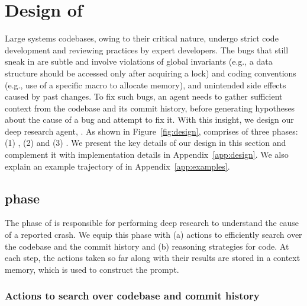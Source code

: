 \section{Design of \cresearcher{}}%
\label{sec:solution}

Large systems codebases, owing to their critical nature, undergo strict code development and reviewing practices by expert developers. The bugs that still sneak in are subtle and involve violations of global invariants (e.g., a data structure should be accessed only after acquiring a lock) and coding conventions (e.g., use of a specific macro to allocate memory), and unintended side effects caused by past changes. To fix such bugs, an agent needs to gather sufficient context from the codebase and its commit history, before generating hypotheses about the cause of a bug and attempt to fix it. With this insight, we design our deep research agent, \cresearcher{}. As shown in Figure~\ref{fig:design}, \cresearcher{} comprises of three phases: (1) \analysisphase, (2) \synthesisphase and (3) \validationphase.
We present the key details of our design in this section and complement it with implementation details in Appendix~\ref{app:design}.
We also explain an example trajectory of \cresearcher{} in Appendix~\ref{app:examples}.

\subsection{\analysisphase phase}

The \analysisphase phase of \cresearcher{} is responsible for performing deep research to understand the cause of a reported crash.
We equip this phase with (a) actions to efficiently search over the codebase and the commit history and (b) reasoning strategies for code. At each step, the actions taken so far along with their results are stored in a context memory, which is used to construct the prompt.

\subsubsection{Actions to search over codebase and commit history}

